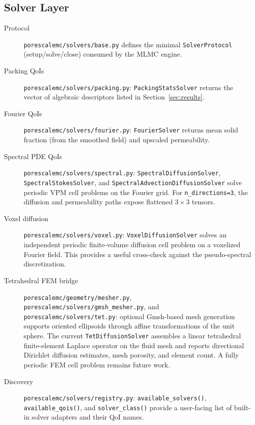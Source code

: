 \documentclass[preprint,12pt]{elsarticle}
\begin{document}
\subsection{Solver Layer}
\begin{description}
  \item[Protocol] \texttt{porescalemc/solvers/base.py} defines the minimal \texttt{SolverProtocol} (setup/solve/close) consumed by the MLMC engine.
  \item[Packing QoIs] \texttt{porescalemc/solvers/packing.py}: \texttt{PackingStatsSolver} returns the vector of algebraic descriptors listed in Section~\ref{sec:results}.
  \item[Fourier QoIs] \texttt{porescalemc/solvers/fourier.py}: \texttt{FourierSolver} returns mean solid fraction (from the smoothed field) and upscaled permeability.
  \item[Spectral PDE QoIs] \texttt{porescalemc/solvers/spectral.py}: \texttt{SpectralDiffusionSolver}, \texttt{SpectralStokesSolver}, and \texttt{SpectralAdvectionDiffusionSolver} solve periodic VPM cell problems on the Fourier grid. For \texttt{n\_directions=3}, the diffusion and permeability paths expose flattened $3\times3$ tensors.
  \item[Voxel diffusion] \texttt{porescalemc/solvers/voxel.py}: \texttt{VoxelDiffusionSolver} solves an independent periodic finite-volume diffusion cell problem on a voxelized Fourier field. This provides a useful cross-check against the pseudo-spectral discretization.
  \item[Tetrahedral FEM bridge] \texttt{porescalemc/geometry/mesher.py}, \texttt{porescalemc/solvers/gmsh\_mesher.py}, and \texttt{porescalemc/solvers/tet.py}: optional Gmsh-based mesh generation supports oriented ellipsoids through affine transformations of the unit sphere. The current \texttt{TetDiffusionSolver} assembles a linear tetrahedral finite-element Laplace operator on the fluid mesh and reports directional Dirichlet diffusion estimates, mesh porosity, and element count. A fully periodic FEM cell problem remains future work.
  \item[Discovery] \texttt{porescalemc/solvers/registry.py}: \texttt{available\_solvers()}, \texttt{available\_qois()}, and \texttt{solver\_class()} provide a user-facing list of built-in solver adapters and their QoI names.
\end{description}
\end{document}
